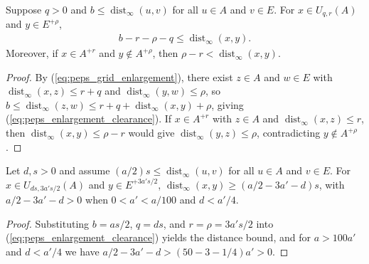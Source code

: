 \begin{lemma}
    \label{thm:peps_enlargement_clearance}
    \leanok
    Suppose $q>0$ and $b\le\operatorname{dist}_{\infty}(u,v)$ for all $u\in A$
    and $v\in E$. For $x\in U_{q,r}(A)$ and $y\in E^{+\rho}$,
    \begin{align}
        b-r-\rho-q\le\operatorname{dist}_{\infty}(x,y).
        \label{eq:peps_enlargement_clearance}
    \end{align}
    Moreover, if $x\in A^{+r}$ and $y\notin A^{+\rho}$, then
    $\rho-r<\operatorname{dist}_{\infty}(x,y)$.
\end{lemma}
\begin{proof}
    \leanok
    By (\ref{eq:peps_grid_enlargement}), there exist $z\in A$ and $w\in E$ with
    $\operatorname{dist}_{\infty}(x,z)\le r+q$ and
    $\operatorname{dist}_{\infty}(y,w)\le\rho$, so
    $b\le\operatorname{dist}_{\infty}(z,w)\le r+q+\operatorname{dist}_{\infty}(x,y)+\rho$,
    giving (\ref{eq:peps_enlargement_clearance}). If $x\in A^{+r}$ with $z\in A$
    and $\operatorname{dist}_{\infty}(x,z)\le r$, then
    $\operatorname{dist}_{\infty}(x,y)\le\rho-r$ would give
    $\operatorname{dist}_{\infty}(y,z)\le\rho$, contradicting $y\notin A^{+\rho}$.
\end{proof}

\begin{lemma}
    \label{thm:peps_scaled_cell_clearance}
    \leanok
    Let $d,s>0$ and assume $(a/2)s\le\operatorname{dist}_{\infty}(u,v)$ for all
    $u\in A$ and $v\in E$. For $x\in U_{ds,3a's/2}(A)$ and $y\in E^{+3a's/2}$,
    $\operatorname{dist}_{\infty}(x,y)\ge(a/2-3a'-d)s$, with $a/2-3a'-d>0$ when
    $0<a'<a/100$ and $d<a'/4$.
\end{lemma}
\begin{proof}
    \leanok
    Substituting $b=as/2$, $q=ds$, and $r=\rho=3a's/2$ into
    (\ref{eq:peps_enlargement_clearance}) yields the distance bound, and for
    $a>100a'$ and $d<a'/4$ we have $a/2-3a'-d>(50-3-1/4)a'>0$.
\end{proof}

